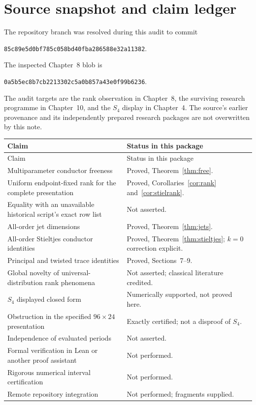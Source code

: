 \documentclass[11pt]{article}
\numberwithin{equation}{section}
\theoremstyle{definition}\newtheorem{definition}[theorem]{Definition}
\theoremstyle{remark}\newtheorem{remark}[theorem]{Remark}
\newcommand{\code}[1]{\texttt{\small #1}}
\begin{document}
\section{Source snapshot and claim ledger}

The repository branch was resolved during this audit to commit
\begin{center}\code{85c89e5d0bf785c058bd40fba286588e32a11382}.\end{center}
The inspected Chapter~8 blob is
\begin{center}\code{0a5b5ec8b7cb2213302c5a0b857a43e0f99b6236}.\end{center}
The audit targets are the rank observation in Chapter~8, the surviving
research programme in Chapter~10, and the $S_4$ display in Chapter~4.
The source's earlier provenance and its independently prepared research
packages are not overwritten by this note.

\begin{longtable}{p{}p{}}
\toprule
Claim & Status in this package\\\midrule
\endfirsthead
\toprule Claim & Status in this package\\\midrule\endhead
Multiparameter conductor freeness & Proved, Theorem~\ref{thm:free}.\\
Uniform endpoint-fixed rank for the complete presentation & Proved, Corollaries~\ref{cor:rank} and~\ref{cor:stielrank}.\\
Equality with an unavailable historical script's exact row list & Not asserted.\\
All-order jet dimensions & Proved, Theorem~\ref{thm:jets}.\\
All-order Stieltjes conductor identities & Proved, Theorem~\ref{thm:stieltjes}; $k=0$ correction explicit.\\
Principal and twisted trace identities & Proved, Sections~7--9.\\
Global novelty of universal-distribution rank phenomena & Not asserted; classical literature credited.\\
$S_4$ displayed closed form & Numerically supported, not proved here.\\
Obstruction in the specified $96\times24$ presentation & Exactly certified; not a disproof of $S_4$.\\
Independence of evaluated periods & Not asserted.\\
Formal verification in Lean or another proof assistant & Not performed.\\
Rigorous numerical interval certification & Not performed.\\
Remote repository integration & Not performed; fragments supplied.\\\bottomrule
\end{longtable}
\end{document}
